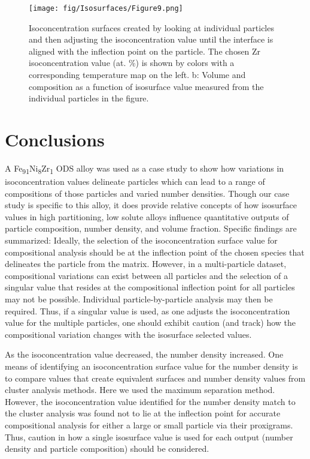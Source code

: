 		\begin{figure}
			\centering
			\texttt{[image: fig/Isosurfaces/Figure9.png]}
			\caption[Isoconcentration surfaces created by looking at individual particles and then adjusting the isoconcentration value until the interface is aligned with the
			inflection point on the particle.]{Isoconcentration surfaces created by looking at individual particles and then adjusting the isoconcentration value until the interface is aligned with the
				inflection point on the particle. The chosen Zr isoconcentration value (at. \%) is shown by colors with a corresponding temperature map on the left. b: Volume and
				composition as a function of isosurface value measured from the individual particles in the figure.}
			\label{fig:Iso9}
		\end{figure}
		
\section*{Conclusions}
	A Fe\textsubscript{91}Ni\textsubscript{8}Zr\textsubscript{1} ODS alloy was used as a case study to show how variations in isoconcentration values delineate particles which can lead to a range of compositions of those particles and varied number densities. Though our case study is specific to this alloy, it does provide relative concepts of how isosurface values in high partitioning, low solute alloys influence quantitative outputs of particle composition, number density, and volume fraction. Specific findings are summarized:
	Ideally, the selection of the isoconcentration surface value for compositional analysis should be at the inflection point of the chosen species that delineates the particle from the matrix. However, in a multi-particle dataset, compositional variations can exist between all particles and the selection of a singular value that resides at the compositional inflection point for all particles may not be possible. Individual particle-by-particle analysis may then be required. Thus, if a singular value is used, as one adjusts the isoconcentration value for the multiple particles, one should exhibit caution (and track) how the compositional variation changes with the isosurface selected values. 
	
	As the isoconcentration value decreased, the number density increased. One means of identifying an isoconcentration surface value for the number density is to compare values that create equivalent surfaces and number density values from cluster analysis methods. Here we used the maximum separation method. However, the isoconcentration value identified for the number density match to the cluster analysis was found not to lie at the inflection point for accurate compositional analysis for either a large or small particle via their proxigrams. Thus, caution in how a single isosurface value is used for each output (number density and particle composition) should be considered.
	
